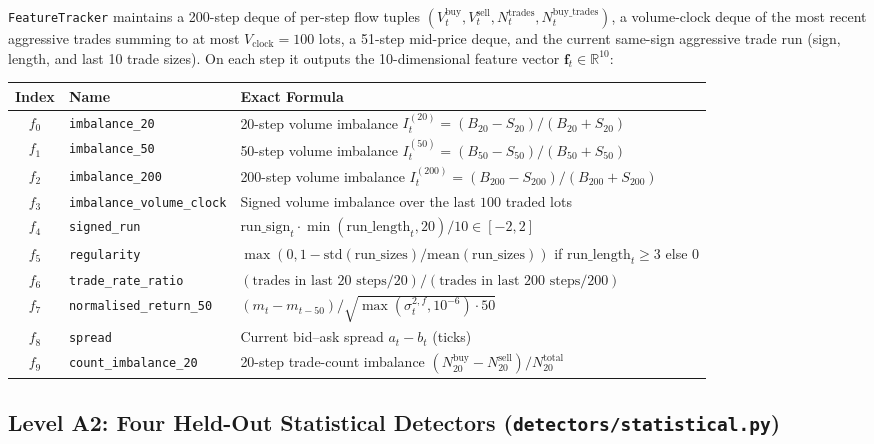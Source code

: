 \documentclass[11pt,a4paper]{article}
\newcommand{\code}[1]{\texttt{#1}}
\begin{document}
\code{FeatureTracker} maintains a 200-step deque of per-step flow tuples
$(V^{\text{buy}}_t, V^{\text{sell}}_t, N^{\text{trades}}_t, N^{\text{buy\_trades}}_t)$, a volume-clock
deque of the most recent aggressive trades summing to at most $V_{\text{clock}} = 100$ lots, a 51-step
mid-price deque, and the current same-sign aggressive trade run (sign, length, and last 10 trade sizes).
On each step it outputs the 10-dimensional feature vector $\mathbf{f}_t \in \mathbb{R}^{10}$:
\begin{center}\small\setlength{\tabcolsep}{4pt}
\begin{tabular}{clL{9.4cm}}
\toprule
Index & Name & Exact Formula \\
\midrule
$f_0$ & \code{imbalance\_20} & 20-step volume imbalance $I^{(20)}_t = (B_{20} - S_{20})/(B_{20} + S_{20})$ \\
$f_1$ & \code{imbalance\_50} & 50-step volume imbalance $I^{(50)}_t = (B_{50} - S_{50})/(B_{50} + S_{50})$ \\
$f_2$ & \code{imbalance\_200} & 200-step volume imbalance $I^{(200)}_t = (B_{200} - S_{200})/(B_{200} + S_{200})$ \\
$f_3$ & \code{imbalance\_volume\_clock} & Signed volume imbalance over the last $100$ traded lots \\
$f_4$ & \code{signed\_run} & $\text{run\_sign}_t \cdot \min(\text{run\_length}_t, 20) / 10 \in [-2, 2]$ \\
$f_5$ & \code{regularity} & $\max(0, 1 - \text{std}(\text{run\_sizes})/\text{mean}(\text{run\_sizes}))$ if $\text{run\_length}_t \ge 3$ else $0$ \\
$f_6$ & \code{trade\_rate\_ratio} & $(\text{trades in last 20 steps}/20) / (\text{trades in last 200 steps}/200)$ \\
$f_7$ & \code{normalised\_return\_50} & $(m_t - m_{t-50}) / \sqrt{\max(\sigma^{2,f}_t, 10^{-6}) \cdot 50}$ \\
$f_8$ & \code{spread} & Current bid--ask spread $a_t - b_t$ (ticks) \\
$f_9$ & \code{count\_imbalance\_20} & 20-step trade-count imbalance $(N^{\text{buy}}_{20} - N^{\text{sell}}_{20}) / N^{\text{total}}_{20}$ \\
\bottomrule
\end{tabular}
\end{center}

\subsection{Level A2: Four Held-Out Statistical Detectors (\code{detectors/statistical.py})}
\end{document}
